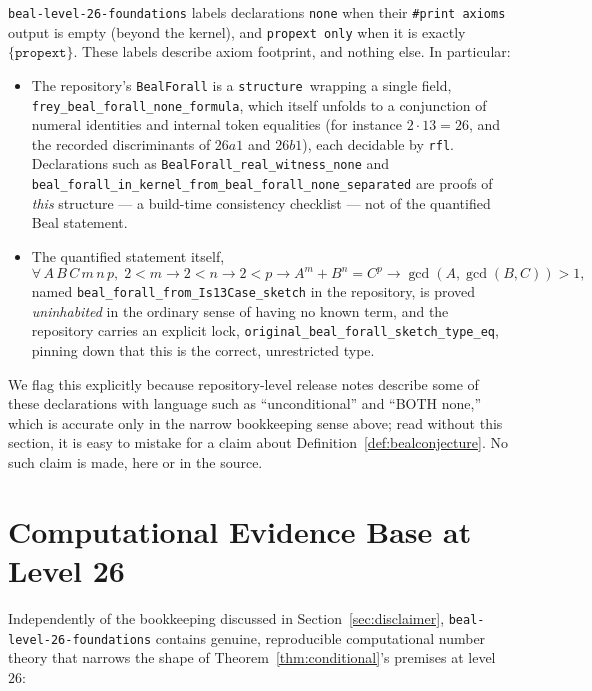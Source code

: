 \documentclass{amsart}
\begin{document}
\texttt{beal-level-26-foundations} labels declarations \texttt{none} when
their \texttt{\#print axioms} output is empty (beyond the kernel), and
\texttt{propext only} when it is exactly $\{\texttt{propext}\}$. These
labels describe axiom footprint, and nothing else. In particular:

\begin{itemize}
  \item The repository's \texttt{BealForall} is a
  \texttt{structure}\ wrapping a single field,
  \texttt{frey\_beal\_forall\_none\_formula}, which itself unfolds to a
  conjunction of numeral identities and internal token equalities (for
  instance $2\cdot 13=26$, and the recorded discriminants of $26a1$ and
  $26b1$), each decidable by \texttt{rfl}. Declarations such as
  \texttt{BealForall\_real\_witness\_none} and
  \texttt{beal\_forall\_in\_kernel\_from\_beal\_forall\_none\_separated}
  are proofs of \emph{this} structure — a build-time consistency
  checklist — not of the quantified Beal statement.
  \item The quantified statement itself,
  \[
  \forall\, A\,B\,C\,m\,n\,p,\; 2<m\to 2<n\to 2<p\to A^m+B^n=C^p\to
  \gcd(A,\gcd(B,C))>1,
  \]
  named \texttt{beal\_forall\_from\_Is13Case\_sketch} in the repository,
  is proved \emph{uninhabited} in the ordinary sense of having no
  known term, and the repository carries an explicit lock,
  \texttt{original\_beal\_forall\_sketch\_type\_eq}, pinning down that
  this is the correct, unrestricted type.
\end{itemize}

We flag this explicitly because repository-level release notes describe
some of these declarations with language such as ``unconditional'' and
``BOTH none,'' which is accurate only in the narrow bookkeeping sense
above; read without this section, it is easy to mistake for a claim about
Definition~\ref{def:bealconjecture}. No such claim is made, here or in the
source.

\section{Computational Evidence Base at Level 26}
\label{sec:level26}

Independently of the bookkeeping discussed in Section~\ref{sec:disclaimer},
\texttt{beal-level-26-foundations} contains genuine, reproducible
computational number theory that narrows the shape of
Theorem~\ref{thm:conditional}'s premises at level $26$:
\end{document}
